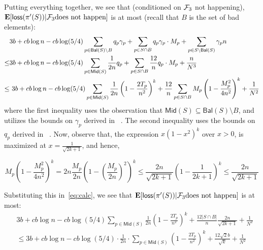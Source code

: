 \documentclass[11pt]{llncs}
\newcommand{\Mid}{{\mathsf{Mid}}}
\newcommand{\Bal}{{\mathsf{Bal}}}
\newcommand{\E}{\mathbf{E}}
\newcommand{\loss}{{\textsf{loss}}}
\begin{document}
  Putting everything together, we see that (conditioned on ${\cal F}_3$ not happening), $\E[\loss(\pi'(S)) | {\cal F}_3 \text{does not happen}]$ is at most (recall that $B$ is the set of bad elements):
 \begin{align}
     &  3 b+ cb \log n - c b \log(5/4) \sum_{p \in \Bal(S) \setminus B} q_p \gamma_p  + \sum_{p \in S \cap B} q_p \gamma_p \cdot M_p   + \sum_{p \in S \setminus \Bal(S)} \gamma_p n\notag \\
     \leq &  3 b+ cb \log n - c b \log(5/4) \sum_{p \in \Mid(S)} \frac{1}{2n} q_p  + \sum_{p \in S \cap B} \frac{12}{n} q_p \cdot M_p +  \frac{n}{N^3} \notag \\
      \leq & \ 3b + cb \log n - c b \log(5/4) \sum_{p \in \Mid(S)} \frac{1}{2n} \left( 1 - \frac{2T_p}{n^2} \right)^k   + \frac{12}{n} \sum_{p \in S \cap B}  M_p \left(1 - \frac{M_p^2}{4n^2}\right)^k + \frac{1}{N^2} \label{eq:calc}
    \end{align}
    where the first inequality uses the observation that $\Mid(S) \subseteq \Bal(S) \setminus B$, and utilizes the bounds on $\gamma_p$ derived in ~. The second inequality uses the bounds on $q_p$ derived in ~.
     Now, observe that, the expression $x (1 - x^2 )^k$ over $x > 0$, is maximized at $x = \frac{1}{\sqrt{2k + 1}}$, and hence,     
     
    $$M_p \left(1 - \frac{M_p^2}{4n^2}\right)^k =  2n \frac{M_p}{2n} \left(1 - \left(\frac{M_p}{2n}\right)^2\right)^k \le \frac{2n}{\sqrt{2k + 1}} \left(1 - \frac{1}{2k + 1} \right)^k \le \frac{2n}{\sqrt{2k + 1}}$$
    
    Substituting this in~\eqref{eq:calc}, we see that $\E[\loss(\pi'(S)) | {\cal F}_3 \text{does not happen}]$ is at most:
    \begin{align*}
&3b + cb \log n  - cb \log (5/4) \sum_{p \in \Mid(S)} \frac{1}{2n} \left( 1 - \frac{2T_p}{n^2} \right)^k  + \frac{12 |S \cap B|}{n} \frac{2n}{\sqrt{2k + 1}} + \frac{1}{N^2}\\
         & \leq 3b + cb \log n  - cb \log (5/4) \cdot \frac{1}{2n} \cdot \sum_{p \in \Mid(S)}  \left( 1 - \frac{2T_p}{n^2} \right)^k  + \frac{12 \sqrt{2} b}{\sqrt{k}} + \frac{1}{N^2}
    \end{align*}
    
\end{document}
